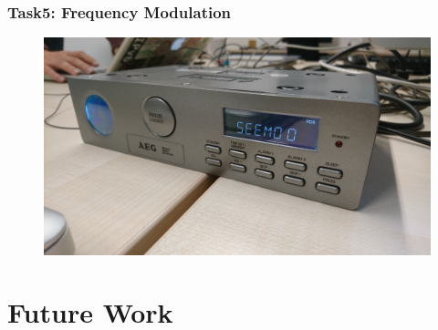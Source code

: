 \documentclass[sigconf]{acmart}
\begin{document}
\hypertarget{Task5:ux20Frequencyux20Modulation}{%
\subsubsection{Task5: Frequency
Modulation}\label{Task5:ux20Frequencyux20Modulation}}

\begin{figure}[tb!]
	\includegraphics[width=1\linewidth]{radio_display.png}
	\caption{}
	\label{fig:rds_filt_plot}
\end{figure}



\section{Future Work}



 
\end{document}
